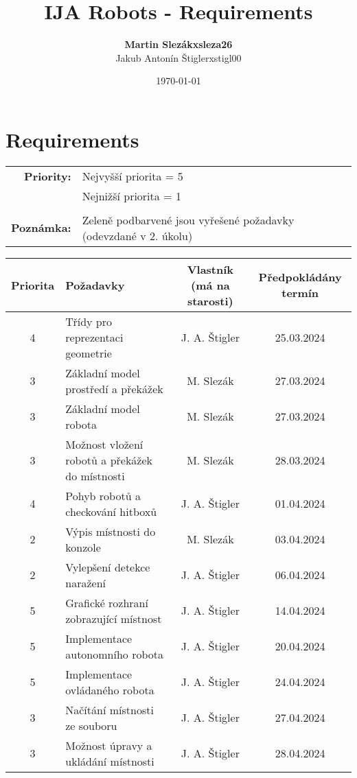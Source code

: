 \documentclass{article}
\title{IJA Robots - Requirements}
\author{
    \begin{tabular}{r l}
        \textbf{Martin Slezák} & \textbf{xsleza26} \\
        Jakub Antonín Štigler  & xstigl00
    \end{tabular}
}
\date{\today}
\begin{document}
\maketitle

\newpage

\section{Requirements}
\begin{tabular}{r l}
    \textbf{Priority:} & Nejvyšší priorita = 5 \\
        & Nejnižší priorita = 1 \\ \\
    \textbf{Poznámka:} &
        \cellcolor{green!30}Zeleně podbarvené jsou vyřešené požadavky
            (odevzdané v 2. úkolu)
\end{tabular}

\vspace{\baselineskip}

\begin{table}[h]
    \centering
    \begin{tabular}{ |c|>{\raggedright\arraybackslash}p{4cm}|c|c| }
        \hline
        \rowcolor{blue!25}Priorita & Požadavky & Vlastník (má na starosti) &
        Předpokládány termín \\
        \hline
        \rowcolor{green!25}4 & Třídy pro reprezentaci geometrie &
            J. A. Štigler & 25.03.2024 \\
        \hline
        \rowcolor{green!25}3 & Základní model prostředí a překážek &
            M. Slezák & 27.03.2024 \\
        \hline
        \rowcolor{green!25}3 & Základní model robota & M. Slezák &
            27.03.2024 \\
        \hline
        \rowcolor{green!25}3 & Možnost vložení robotů a překážek do místnosti &
            M. Slezák & 28.03.2024 \\
        \hline
        \rowcolor{green!25}4 & Pohyb robotů a checkování hitboxů &
            J. A. Štigler & 01.04.2024 \\
        \hline
        \rowcolor{green!25}2 & Výpis místnosti do konzole & M. Slezák &
            03.04.2024 \\
        \hline
        2 & Vylepšení detekce naražení & J. A. Štigler & 06.04.2024 \\
        \hline
        5 & Grafické rozhraní zobrazující místnost & J. A. Štigler &
            14.04.2024 \\
        \hline
        5 & Implementace autonomního robota & J. A. Štigler & 20.04.2024 \\
        \hline
        5 & Implementace ovládaného robota & J. A. Štigler & 24.04.2024 \\
        \hline
        3 & Načítání místnosti ze souboru & J. A. Štigler & 27.04.2024 \\
        \hline
        3 & Možnost úpravy a ukládání místnosti & J. A. Štigler & 28.04.2024 \\
        \hline
    \end{tabular}
\end{table}
\end{document}
